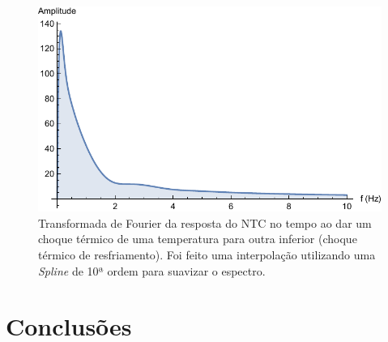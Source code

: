 \documentclass[a4paper]{instrumentacao}
\begin{document}
\begin{figure}[H]
\center
\includegraphics[width=\textwidth]{ThermalShock-Down-Frequency.pdf}
\caption{Transformada de Fourier da resposta do NTC no tempo ao dar um choque térmico de uma temperatura para outra inferior (choque térmico de resfriamento). Foi feito uma interpolação utilizando uma \textit{Spline} de 10ª ordem para suavizar o espectro.}
\label{fig:ntc-choque-abaixo-frequencia}
\end{figure}

\chapter{Conclusões}

\end{document}

